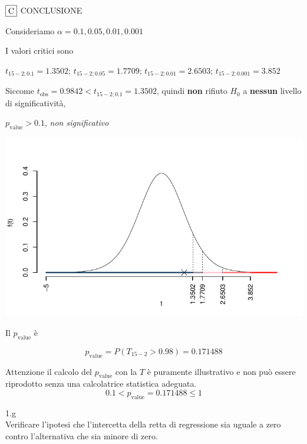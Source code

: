\documentclass[
  11pt,
]{book}
\theoremstyle{mytheoremstyle}
\theoremstyle{mydefstyle}
\newenvironment{sol}
  {
  \begin{tcolorbox}[enhanced,breakable,arc=0.1mm,boxrule=1pt,colback=white,colframe=iblue,
  title=\bf \fontfamily{lmss}\selectfont \hspace{.5 cm} Soluzione,drop fuzzy shadow]

}{
\end{tcolorbox}
  }
\begin{document}
\begin{sol}
\(\fbox{C}\) CONCLUSIONE

Consideriamo \(\alpha=0.1, 0.05, 0.01, 0.001\)

I valori critici sono

\(t_{15-2;0.1}=1.3502\); \(t_{15-2;0.05}=1.7709\); \(t_{15-2;0.01}=2.6503\); \(t_{15-2;0.001}=3.852\)

Siccome \(t_\text{obs}=0.9842<t_{15-2;0.1}=1.3502\), quindi \textbf{non} rifiuto \(H_0\) a \textbf{nessun} livello di significatività,

\(p_\text{value}>0.1\), \emph{non significativo}

\begin{center}\includegraphics{Esami_passati_con_soluzioni_files/figure-latex/06-regr-27,-1} \end{center}

Il \(p_{\text{value}}\) è

\[ p_{\text{value}} = P(T_{15-2}>0.98)=0.171488 \]

Attenzione il calcolo del \(p_\text{value}\) con la \(T\) è puramente illustrativo e non può essere riprodotto senza una calcolatrice statistica adeguata.\[
 0.1 < p_\text{value}= 0.171488 \leq 1 
\]

\end{sol}

1.g\\
Verificare l'ipotesi che l'intercetta della retta di
regressione sia uguale a zero contro l'alternativa che sia
minore di zero.
\end{document}
